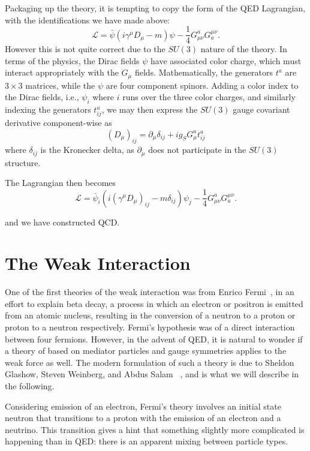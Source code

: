 Packaging up the theory, it is tempting to copy the form of the QED Lagrangian,
with the identifications we have made above:
\begin{equation}
\mathcal{L} = \bar{\psi}(i\gamma^{\mu}D_{\mu} - m)\psi -\frac{1}{4} G_{\mu\nu}^{a}G^{\mu\nu}_{a}.
\end{equation}
However this is not quite correct due to the $SU(3)$ nature of the theory. In terms of the physics,
the Dirac fields $\psi$ have associated color charge, which must interact appropriately with the 
$G_{\mu}$ fields. Mathematically, the generators $t^{a}$ are $3\times 3$ matrices, while the $\psi$ are
four component spinors. Adding a color index to the Dirac fields, i.e., $\psi_{i}$ where $i$ runs over 
the three color charges, and similarly indexing the generators $t_{ij}^{a}$, we may then express the 
$SU(3)$ gauge covariant derivative component-wise as 
\begin{equation}
(D_{\mu})_{ij} = \partial_{\mu}\delta_{ij} + ig_{S}G_{\mu}^{a}t^{a}_{ij}
\end{equation}
where $\delta_{ij}$ is the Kronecker delta, as $\partial_{\mu}$ does not participate in the $SU(3)$
structure.

The Lagrangian then becomes
\begin{equation}
\mathcal{L} = \bar{\psi}_{i}(i(\gamma^{\mu}D_{\mu})_{ij} - m\delta_{ij})\psi_{j} -\frac{1}{4} G_{\mu\nu}^{a}G^{\mu\nu}_{a}.
\end{equation}

and we have constructed QCD.


\section{The Weak Interaction}
One of the first theories of the weak interaction was from Enrico Fermi~\cite{Fermi}, in an effort to 
explain beta decay, a process in which an electron or positron is emitted from an atomic nucleus, resulting 
in the conversion of a neutron to a proton or proton to a neutron respectively. Fermi's hypothesis was 
of a direct interaction between four fermions. However, in the advent of QED, it is natural to wonder if 
a theory of based on mediator particles and gauge symmetries applies to the weak force as well. The modern formulation 
of such a theory is due to Sheldon Glashow, Steven Weinberg, and Abdus Salam ~\cite{Glashow}, and is what we will 
describe in the following.

Considering emission of an electron, Fermi's theory involves an initial state neutron that transitions 
to a proton with the emission of an electron and a neutrino. This transition gives a hint that something 
slightly more complicated is happening than in QED: there is an apparent mixing between particle types. 

